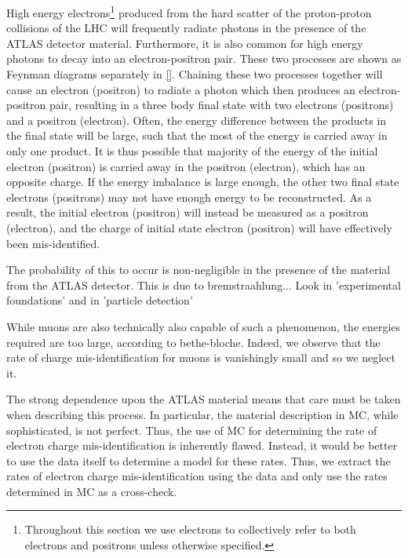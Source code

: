 

High energy electrons\footnote{Throughout this section we use 
electrons to collectively refer to both electrons and positrons
unless otherwise specified.} produced from the 
hard scatter of the proton-proton
collisions of the LHC
will frequently radiate photons in the presence of the ATLAS
detector material. Furthermore, it is also common %
for high energy photons to decay into an electron-positron pair.
These two processes are shown as Feynman diagrams 
separately in \fig\ref{}.
Chaining these two processes together will cause 
an electron (positron) to radiate a photon which then produces an
electron-positron pair, resulting in a three body final state with
two electrons (positrons) and a positron (electron).
Often, the energy difference between the products in the final state will
be large, such that the most of the energy is carried away in only one
product.  It is thus possible that majority of the energy of the initial
electron (positron) is carried away in the positron (electron), which
has an opposite charge.  If the energy imbalance is large enough,
the other two final state electrons (positrons) may not have enough
energy to be reconstructed. As a result, the initial electron
(positron) will instead be measured as a positron (electron), and the 
charge of initial state electron (positron) will have effectively 
been mis-identified. 


The probability of this to occur is non-negligible in the presence of the material 
from the ATLAS detector. This is due to bremstraahlung...
Look in 'experimental foundations' and in 'particle detection'


While muons are also technically also capable of such a phenomenon, the 
energies required are too large, according to bethe-bloche.
Indeed, we observe that the rate of charge mis-identification for muons
is vanishingly small and so we neglect it. %

The strong dependence upon the ATLAS material means that care must be
taken when describing this process. In particular, the material 
description in MC, while sophisticated, is not perfect. Thus, the use of MC
for determining the rate of electron charge mis-identification is inherently
flawed. Instead, it would be better to use the data itself to determine
a model for these rates. 
Thus, we extract the rates of electron charge 
mis-identification using the data and only use the rates determined
in MC as a cross-check.

